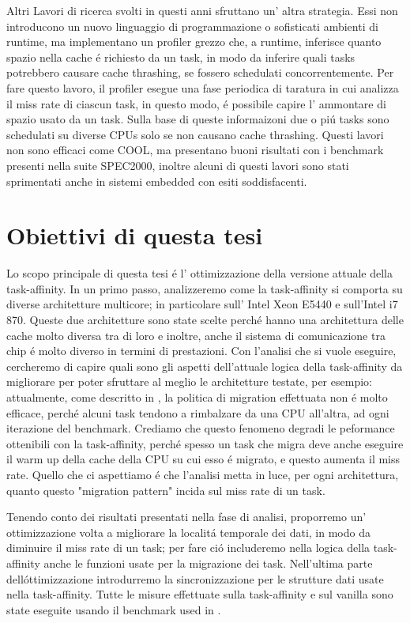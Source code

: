 Altri Lavori di ricerca svolti in questi anni sfruttano un' altra strategia. Essi non introducono un nuovo linguaggio di programmazione o sofisticati 
ambienti di runtime, ma implementano un profiler grezzo che, a runtime, inferisce quanto spazio nella cache \'e richiesto da un task, in modo da inferire 
quali tasks potrebbero causare cache thrashing, se fossero schedulati concorrentemente. Per fare questo lavoro, il profiler esegue una fase periodica di
taratura in cui analizza il miss rate di ciascun task, in questo modo, \'e possibile capire l' ammontare di spazio usato da un task. Sulla base di queste
informaizoni due o pi\'u tasks sono schedulati su diverse CPUs solo se non causano cache thrashing. Questi lavori non sono efficaci come COOL, ma presentano
buoni risultati con i benchmark presenti nella suite SPEC2000, inoltre alcuni di questi lavori sono stati sprimentati anche in sistemi embedded con esiti
soddisfacenti.

\section{Obiettivi di questa tesi}
\label{sec:ObbiettiviTesi}

Lo scopo principale di questa tesi \'e l' ottimizzazione della versione attuale della task-affinity. In un primo passo, analizzeremo come la task-affinity 
si comporta su diverse architetture multicore; in particolare sull' Intel Xeon E5440 e sull'Intel i7 870. Queste due architetture sono state scelte
perch\'e hanno una architettura delle cache molto diversa tra di loro e inoltre, anche il sistema di comunicazione tra chip \'e molto diverso in termini
di prestazioni. Con l'analisi che si vuole eseguire, cercheremo di capire quali sono gli aspetti dell'attuale logica della task-affinity da migliorare per
poter sfruttare al meglio le architetture testate, per esempio: attualmente, come descritto in \cite{lcs}, la politica di migration effettuata non \'e 
molto efficace, perch\'e alcuni task tendono a rimbalzare da una CPU all'altra, ad ogni iterazione del benchmark. Crediamo che questo fenomeno degradi
le peformance ottenibili con la task-affinity, perch\'e spesso un task che migra deve anche eseguire il warm up della cache della CPU su cui esso \'e
migrato, e questo aumenta il miss rate. Quello che ci aspettiamo \'e che l'analisi metta in luce, per ogni architettura, quanto questo "migration pattern" 
incida sul miss rate di un task.

Tenendo conto dei risultati presentati nella fase di analisi, proporremo un' ottimizzazione volta a migliorare la localit\'a temporale dei dati, in modo da
diminuire il miss rate di un task; per fare ci\'o includeremo nella logica della task-affinity anche le funzioni usate per la migrazione dei task. 
Nell'ultima parte dell\'ottimizzazione introdurremo la sincronizzazione per le strutture dati usate nella task-affinity. Tutte le misure effettuate sulla 
task-affinity e sul vanilla sono state eseguite usando il benchmark used in \cite{lcs}.

